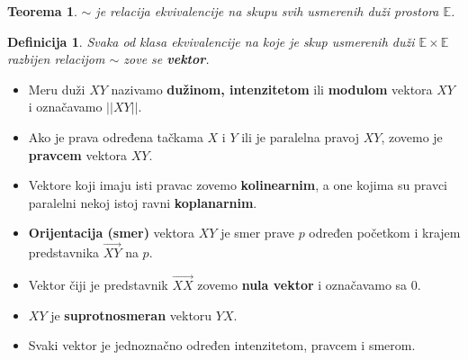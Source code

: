 \documentclass[a4paper,12pt,twoside]{report}
\newtheorem{theorem}{Teorema}[section]
\newtheorem{definition}{Definicija}[section]
\numberwithin{algorithm}{section}
\begin{document}
\begin{figure}[!h]
  \centering
\end{figure}

\begin{theorem}
    $\sim$ je relacija ekvivalencije na skupu svih usmerenih duži prostora $\mathbb{E}$.
\end{theorem}

\begin{definition}
    Svaka od klasa ekvivalencije na koje je skup usmerenih duži $\mathbb{E}\times\mathbb{E}$ razbijen relacijom $\sim$ zove se \textbf{vektor}.
\end{definition}

\begin{itemize}
    \item Meru duži $XY$ nazivamo \textbf{dužinom, intenzitetom} ili \textbf{modulom} vektora $XY$ i označavamo $||XY||$.
    \item Ako je prava određena tačkama $X$ i $Y$ ili je paralelna pravoj $XY$, zovemo je \textbf{pravcem} vektora $XY$.
    \item Vektore koji imaju isti pravac zovemo \textbf{kolinearnim}, a one kojima su pravci paralelni nekoj istoj ravni \textbf{koplanarnim}.
    \item \textbf{Orijentacija (smer)} vektora $XY$ je smer prave $p$ određen početkom i krajem predstavnika $\overrightarrow{XY}$ na $p$.
    \item Vektor čiji je predstavnik $\overrightarrow{XX}$ zovemo \textbf{nula vektor} i označavamo sa $0$.
    \item $XY$ je \textbf{suprotnosmeran} vektoru $YX$.
    \item Svaki vektor je jednoznačno određen intenzitetom, pravcem i smerom.
\end{itemize}
\end{document}
